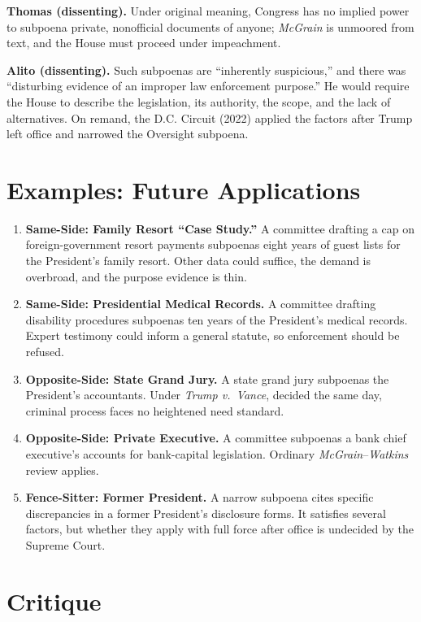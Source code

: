 \documentclass[12pt]{article}
\begin{document}
\textbf{Thomas (dissenting).} Under original meaning, Congress has no implied power to subpoena private, nonofficial documents of anyone; \textit{McGrain} is unmoored from text, and the House must proceed under impeachment.

\textbf{Alito (dissenting).} Such subpoenas are ``inherently suspicious,'' and there was ``disturbing evidence of an improper law enforcement purpose.'' He would require the House to describe the legislation, its authority, the scope, and the lack of alternatives. On remand, the D.C. Circuit (2022) applied the factors after Trump left office and narrowed the Oversight subpoena.

\section{Examples: Future Applications}

\begin{enumerate}
\item \textbf{Same-Side: Family Resort ``Case Study.''} A committee drafting a cap on foreign-government resort payments subpoenas eight years of guest lists for the President's family resort. Other data could suffice, the demand is overbroad, and the purpose evidence is thin.
\item \textbf{Same-Side: Presidential Medical Records.} A committee drafting disability procedures subpoenas ten years of the President's medical records. Expert testimony could inform a general statute, so enforcement should be refused.
\item \textbf{Opposite-Side: State Grand Jury.} A state grand jury subpoenas the President's accountants. Under \textit{Trump v.\ Vance}, decided the same day, criminal process faces no heightened need standard.
\item \textbf{Opposite-Side: Private Executive.} A committee subpoenas a bank chief executive's accounts for bank-capital legislation. Ordinary \textit{McGrain}--\textit{Watkins} review applies.
\item \textbf{Fence-Sitter: Former President.} A narrow subpoena cites specific discrepancies in a former President's disclosure forms. It satisfies several factors, but whether they apply with full force after office is undecided by the Supreme Court.
\end{enumerate}

\section{Critique}
\end{document}
